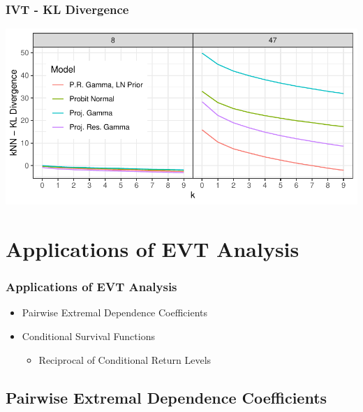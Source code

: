 \documentclass[aspectratio=169]{beamer}
\begin{document}
\begin{frame}
  \frametitle{IVT - KL Divergence}
  \begin{center}
    \includegraphics[width=0.9\linewidth]{./images/knn_kld}
  \end{center}
\end{frame}

\section{Applications of EVT Analysis}

\begin{frame}
  \frametitle{Applications of EVT Analysis}
  \begin{itemize}
    \item Pairwise Extremal Dependence Coefficients
    \item Conditional Survival Functions
      \begin{itemize}
        \item Reciprocal of Conditional Return Levels
      \end{itemize}
  \end{itemize}
\end{frame}

\subsection{Pairwise Extremal Dependence Coefficients}
\end{document}
